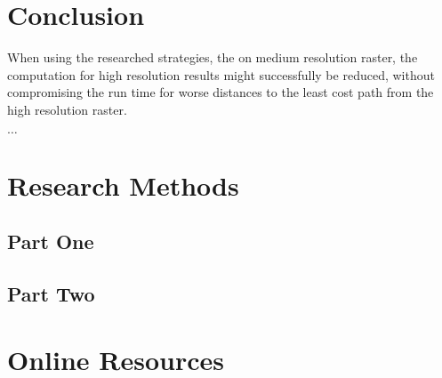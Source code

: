 \documentclass[acmtog]{acmart}
\begin{document}
	\section{Conclusion}\label{sec:conclusion}
	When using the researched strategies, the on medium resolution raster, the computation for high resolution results might successfully be reduced, without compromising the run time for worse distances to the least cost path from the high resolution raster.



\begin{acks}
	$\ldots$
\end{acks}





\appendix

\section{Research Methods}\label{sec:research-methods}

	\subsection{Part One}\label{subsec:part-one}

	\subsection{Part Two}\label{subsec:part-two}


	\section{Online Resources}\label{sec:online-resources}
\end{document}
